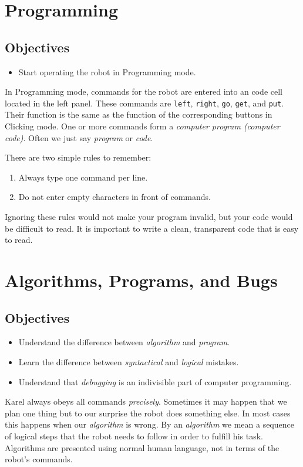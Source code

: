 
\section{Programming} \label{sec:bridge}

\subsection{Objectives} 
 
\begin{itemize}
\item Start operating the robot in Programming mode.
\end{itemize}
In Programming mode, commands for the robot are entered into an code cell located in the left panel.
These commands are {\tt left}, {\tt right}, {\tt go}, {\tt get}, and {\tt put}.
Their function is the same as the function of the corresponding buttons in Clicking mode.
One or more commands form a {\em computer program (computer code)}. Often 
we just say {\em program} or {\em code}.

There are two simple rules to remember:
\begin{enumerate}
\item Always type one command per line.
\item Do not enter empty characters in front of commands. 
\end{enumerate}
Ignoring these rules would not make your program invalid, but your code would be 
difficult to read. It is important to write a clean, transparent code that is easy to read. 


\section{Algorithms, Programs, and Bugs} \label{sec:interm1}

\subsection{Objectives} 
 
\begin{itemize}
\item Understand the difference between {\em algorithm} and {\em program}. 
\item Learn the difference between {\em syntactical} and {\em logical} mistakes.
\item Understand that {\em debugging} is an indivisible part of computer programming.
\end{itemize}
Karel always obeys all commands {\em precisely}. Sometimes it may happen that 
we plan one thing but to our surprise the robot does something else. In most cases this 
happens when our {\em algorithm} is wrong. By an {\em algorithm} we mean a sequence of 
logical steps that the robot needs to follow in order to fulfill his task. Algorithms 
are presented using normal human language, not in terms of the robot's commands. 

